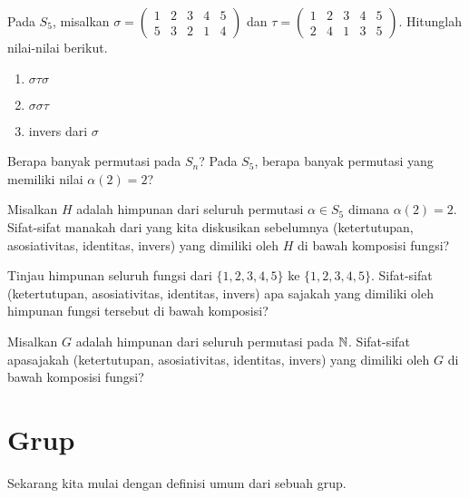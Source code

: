 \begin{exc}
Pada $S_5$, misalkan $\sigma = \begin{pmatrix} 
1 & 2 & 3 & 4 & 5 \\
5 & 3 & 2 & 1 & 4
\end{pmatrix}$ dan $\tau =  \begin{pmatrix} 
1 & 2 & 3 & 4 & 5\\
2 & 4 & 1 & 3 & 5
\end{pmatrix}$. Hitunglah nilai-nilai berikut.
  \begin{enumerate}
  	\item $\sigma \tau \sigma$
  	\item $\sigma \sigma \tau$
  	\item invers dari $\sigma$
  \end{enumerate}
\end{exc}

\begin{exc}
  Berapa banyak permutasi pada $S_n$? Pada $S_5$, berapa banyak permutasi yang memiliki nilai $\alpha(2) = 2$?
\end{exc}

\begin{exc}
  Misalkan $H$ adalah himpunan dari seluruh permutasi $\alpha \in S_5$ dimana $\alpha(2) = 2$. Sifat-sifat manakah dari yang kita diskusikan sebelumnya (ketertutupan, asosiativitas, identitas, invers) yang dimiliki oleh $H$ di bawah komposisi fungsi?
\end{exc}

\begin{exc}
  Tinjau himpunan seluruh fungsi dari $\{ 1, 2, 3, 4, 5 \}$ ke $\{ 1, 2, 3, 4, 5 \}$. Sifat-sifat (ketertutupan, asosiativitas, identitas, invers) apa sajakah yang dimiliki oleh himpunan fungsi tersebut di bawah komposisi?
\end{exc}

\begin{exc}
  Misalkan $G$ adalah himpunan dari seluruh permutasi pada $\mathbb{N}$. Sifat-sifat apasajakah (ketertutupan, asosiativitas, identitas, invers) yang dimiliki oleh $G$ di bawah komposisi fungsi?
\end{exc}


\section{Grup}

Sekarang kita mulai dengan definisi umum dari sebuah grup.


